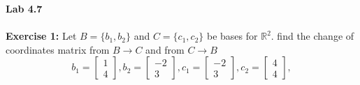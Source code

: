 \documentclass{amsart}
\def\RR{{\mathbb R}}
\begin{document}
\thispagestyle{fancy}





{\huge\textbf{Lab 4.7}}\\\\

\noindent\textbf{Exercise 1: }Let $B = \{b_1,b_2\}$ and $C = \{c_1,c_2\}$ be bases for $\RR^2$. find the change of coordinates matrix from $B \to C$ and from $C \to B$
\begin{equation*}
b_1 =
\begin{bmatrix}
1\\
4
\end{bmatrix},
b_2 =
\begin{bmatrix}
-2\\
3
\end{bmatrix},
c_1 =
\begin{bmatrix}
-2\\
3
\end{bmatrix},
c_2 =
\begin{bmatrix}
4\\
4
\end{bmatrix},
\end{equation*}
\end{document}
